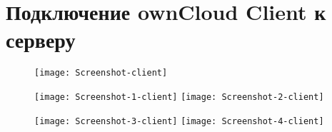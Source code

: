 \section{Подключение ownCloud Client к серверу} \label{pril:d}

\begin{figure}[ht]
    \centering
	\texttt{[image: Screenshot-client]}
\end{figure}

\begin{figure}[ht]
    \centering
    \texttt{[image: Screenshot-1-client]}
	\texttt{[image: Screenshot-2-client]}
\end{figure}

\begin{figure}[ht]
    \centering
    \texttt{[image: Screenshot-3-client]}
	\texttt{[image: Screenshot-4-client]}
\end{figure}

\clearpage
